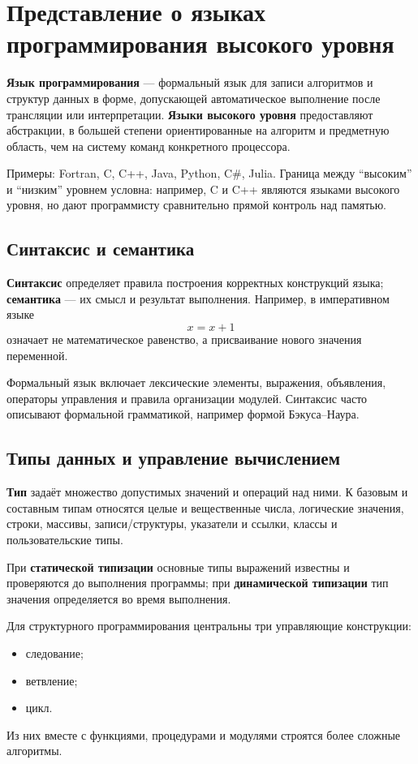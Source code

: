 \section{Представление о языках программирования высокого уровня}

\textbf{Язык программирования} --- формальный язык для записи алгоритмов и структур данных в форме, допускающей автоматическое выполнение после трансляции или интерпретации. \textbf{Языки высокого уровня} предоставляют абстракции, в большей степени ориентированные на алгоритм и предметную область, чем на систему команд конкретного процессора.

Примеры: Fortran, C, C++, Java, Python, C\#, Julia. Граница между ``высоким'' и ``низким'' уровнем условна: например, C и C++ являются языками высокого уровня, но дают программисту сравнительно прямой контроль над памятью.

\subsection{Синтаксис и семантика}

\textbf{Синтаксис} определяет правила построения корректных конструкций языка; \textbf{семантика} --- их смысл и результат выполнения. Например, в императивном языке
\[
x=x+1
\]
означает не математическое равенство, а присваивание нового значения переменной.

Формальный язык включает лексические элементы, выражения, объявления, операторы управления и правила организации модулей. Синтаксис часто описывают формальной грамматикой, например формой Бэкуса--Наура.

\subsection{Типы данных и управление вычислением}

\textbf{Тип} задаёт множество допустимых значений и операций над ними. К базовым и составным типам относятся целые и вещественные числа, логические значения, строки, массивы, записи/структуры, указатели и ссылки, классы и пользовательские типы.

При \textbf{статической типизации} основные типы выражений известны и проверяются до выполнения программы; при \textbf{динамической типизации} тип значения определяется во время выполнения.

Для структурного программирования центральны три управляющие конструкции:
\begin{itemize}
\item следование;
\item ветвление;
\item цикл.
\end{itemize}
Из них вместе с функциями, процедурами и модулями строятся более сложные алгоритмы.

